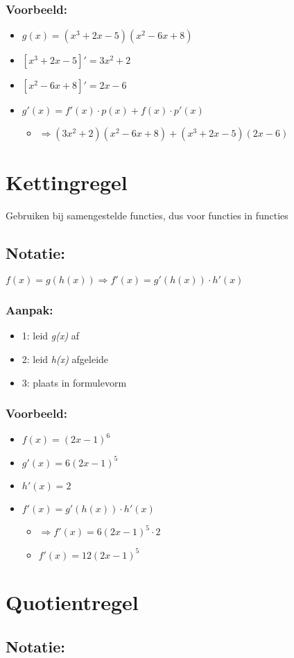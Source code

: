 \documentclass[11pt]{article}
\begin{document}
\subsubsection{Voorbeeld:}
\label{sec:orgee0583e}
\begin{itemize}
\item \(g(x) = (x^{3}+2x-5)(x^{2}-6x+8)\)
\item \([x^{3}+2x-5]' = 3x^{2}+2\)
\item \([x^{2}-6x+8]' = 2x-6\)
\item \(g'(x) = f'(x) \cdot p(x) + f(x) \cdot p'(x)\)
\begin{itemize}
\item \(\Rightarrow  (3x^{2}+2)(x^{2}-6x+8) + (x^{3}+2x-5)(2x-6)\)
\end{itemize}
\end{itemize}



\section{Kettingregel}
\label{sec:orgcd8f055}
Gebruiken bij samengestelde functies, dus voor functies in functies
\subsection{Notatie:}
\label{sec:org2e3521c}
\(f(x) = g(h(x)) \Rightarrow f'(x) = g'(h(x)) \cdot h'(x)\)
\subsubsection{Aanpak:}
\label{sec:org6a0c404}
\begin{itemize}
\item 1: leid \textit{g(x)} af
\item 2: leid \textit{h(x)} afgeleide
\item 3: plaats in formulevorm
\end{itemize}
\subsubsection{Voorbeeld:}
\label{sec:org6fe5313}
\begin{itemize}
\item \(f(x) = (2x-1)^{6}\)
\item \(g'(x) = 6(2x-1)^{5}\)
\item \(h'(x) = 2\)
\item \(f'(x) = g'(h(x)) \cdot h'(x)\)
\begin{itemize}
\item \(\Rightarrow f'(x) = 6(2x-1)^5 \cdot 2\)
\item \(f'(x) = 12(2x-1)^5\)
\end{itemize}
\end{itemize}




\section{Quotientregel}
\label{sec:org23f7804}
\subsection{Notatie:}
\label{sec:orgfa0278f}
\end{document}
